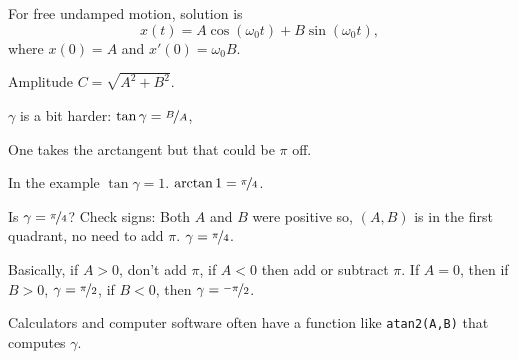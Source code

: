 \documentclass[10pt,aspectratio=169]{beamer}
\begin{document}
\begin{frame}
For free undamped motion, solution is
\begin{equation*}
x(t) = A \cos (\omega_0 t) + B \sin (\omega_0 t) ,
\end{equation*}
where $x(0) = A$ and $x'(0) = \omega_0 B$.

\medskip
\pause

Amplitude $C = \sqrt{A^2+B^2}$.

\medskip
\pause

$\gamma$ is a bit harder: $\tan \gamma = \nicefrac{B}{A}$, 

\pause

One takes the arctangent but that could be $\pi$ off.

\medskip
\pause

In the example $\tan \gamma = 1$.  \quad $\arctan 1 = \nicefrac{\pi}{4}$.

\medskip
\pause

Is $\gamma = \nicefrac{\pi}{4}$? \pause  Check signs: Both $A$ and $B$ were
positive so, $(A,B)$ is in the first quadrant, no need to add $\pi$.
\pause
$\gamma = \nicefrac{\pi}{4}$.

\medskip
\pause

Basically, if $A > 0$, don't add $\pi$, if $A < 0$ then add or subtract
$\pi$. \pause
If $A = 0$, then if $B > 0$, $\gamma = \nicefrac{\pi}{2}$, if
$B < 0$, then $\gamma =\nicefrac{-\pi}{2}$.

\medskip
\pause

Calculators and computer software often have a function like
\texttt{atan2(A,B)} that computes $\gamma$.

\end{frame}
\end{document}
